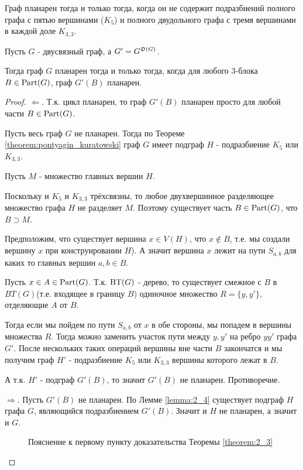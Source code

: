 \begin{remrk} \label{theorem:pontyagin_kuratowski}
	Граф планарен тогда и только тогда, когда он не содержит подразбиений полного графа с пятью вершинами ($K_5$) и полного двудольного графа с тремя вершинами в каждой доле $K_{3,3}$.
\end{remrk}

\begin{thm} \label{theorem:2_3}
	Пусть $G$ - двусвязный граф, а  $G' = G^{\mathfrak{D}(G)}$.

	Тогда граф  $G$ планарен тогда и только тогда, когда для любого 3-блока  $B \in \operatorname{Part}(G)$, граф  $G'(B)$ планарен.
\end{thm}

\begin{proof}
	$\Longleftarrow$. Т.к. цикл планарен, то граф $G'(B)$ планарен просто для любой части  $B \in \operatorname{Part}(G)$.

	Пусть весь граф $G$ не планарен. Тогда по Теореме \ref{theorem:pontyagin_kuratowski} граф  $G$ имеет подграф  $H$ - подразбиение  $K_5$ или  $K_{3,3}$.

	Пусть $M$ - множество главных вершин  $H$.

	Поскольку и $K_5$ и  $K_{3,3}$ трёхсвязны, то любое двухвершинное разделяющее множество графа  $H$ не разделяет $M$.
	Поэтому существует часть  $B \in \operatorname{Part}(G)$, что  $B \supset M$.

	Предположим, что существует вершина $x \in V(H)$, что  $x \not \in B$, т.е. мы создали вершину $x$ при конструировании  $H$).
	А значит вершина $x$ лежит на пути  $S_{a, b}$ для каких то главных вершин $a, b \in B$.

	Пусть $x \in A \in \operatorname{Part}(G)$.
	Т.к. $\operatorname{BT}(G)$ - дерево, то существует смежное с  $B$ в  $BT(G)$(т.е. входящее в границу $B$) одиночное множество $R = \{y, y'\}$, отделяющие $A$ от  $B$.

	Тогда если мы пойдем по пути  $S_{a, b}$ от  $x$ в обе стороны, мы попадем в вершины множества  $R$.
	Тогда можно заменить участок пути между  $y, y'$ на ребро $yy'$ графа  $G'$.
	После нескольких таких операций вершины вне части  $B$ закончатся и мы получим граф  $H'$ - подразбиение  $K_5$ или  $K_{3,3}$ вершины которого лежат в  $B$.

	А т.к.  $H'$ - подграф  $G'(B)$, то значит  $G'(B)$ не планарен. Противоречие.

	 $\Longrightarrow$. Пусть  $G'(B)$ не планарен.
	 По Лемме \ref{lemma:2_4} существует подграф  $H$ графа  $G$, являющийся подразбиением  $G'(B)$.
	 Значит и  $H$ не планарен, а значит и  $G$.


\begin{figure}[ht]
    \centering
	\caption{Пояснение к первому пункту доказательства Теоремы \ref{theorem:2_3}}
    \label{fig:theorem_2_3}
\end{figure}

\end{proof}

